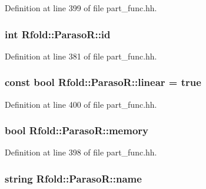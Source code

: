 Definition at line 399 of file part\+\_\+func.\+hh.

\hypertarget{class_rfold_1_1_paraso_r_a707ccdcc12115fbe06a923fb21e58c06}{
\subsubsection[{id}]{\setlength{\rightskip}{0pt plus 5cm}int Rfold\+::\+Paraso\+R\+::id}}\label{class_rfold_1_1_paraso_r_a707ccdcc12115fbe06a923fb21e58c06}


Definition at line 381 of file part\+\_\+func.\+hh.

\hypertarget{class_rfold_1_1_paraso_r_a45220d67941bf0c7f97c1eb586511cb8}{
\subsubsection[{linear}]{\setlength{\rightskip}{0pt plus 5cm}const bool Rfold\+::\+Paraso\+R\+::linear = true\hspace{0.3cm}{\ttfamily [static]}}}\label{class_rfold_1_1_paraso_r_a45220d67941bf0c7f97c1eb586511cb8}


Definition at line 400 of file part\+\_\+func.\+hh.

\hypertarget{class_rfold_1_1_paraso_r_aac983ca08d7d6efbca76b6575ee839e2}{
\subsubsection[{memory}]{\setlength{\rightskip}{0pt plus 5cm}bool Rfold\+::\+Paraso\+R\+::memory}}\label{class_rfold_1_1_paraso_r_aac983ca08d7d6efbca76b6575ee839e2}


Definition at line 398 of file part\+\_\+func.\+hh.

\hypertarget{class_rfold_1_1_paraso_r_a52b17c1475bc8319251b6fbde1a5a6d9}{
\subsubsection[{name}]{\setlength{\rightskip}{0pt plus 5cm}string Rfold\+::\+Paraso\+R\+::name}}\label{class_rfold_1_1_paraso_r_a52b17c1475bc8319251b6fbde1a5a6d9}


